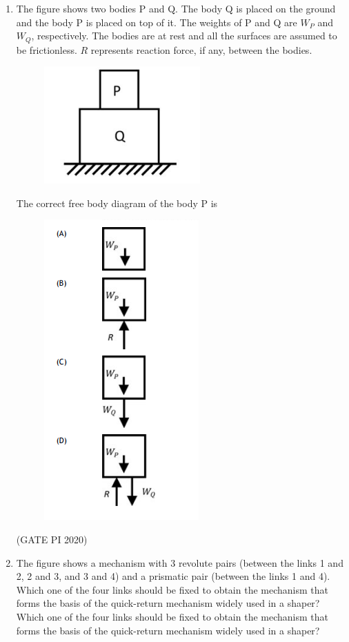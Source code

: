 \documentclass[journal,12pt,onecolumn]{IEEEtran}
\theoremstyle{remark}
\begin{document}
\begin{enumerate}
\item The figure shows two bodies P and Q. The body Q is placed on the ground and the body P is placed on top of it. The weights of P and Q are $W_P$ and $W_Q$, respectively. The bodies are at rest and all the surfaces are assumed to be frictionless. $R$ represents reaction force, if any, between the bodies.
\newpage
\begin{figure}[h]
    \centering
    \includegraphics[width=0.5\columnwidth]{figs/fig5.png}
    \caption{}
    \label{fig:placeholder}
\end{figure}


The correct free body diagram of the body P is
\begin{figure}[h]
    \includegraphics[width=0.4\columnwidth]{figs/fig6.png}
    \caption{}
    \label{fig:placeholder}
\end{figure}

\hfill (GATE PI 2020)

\item The figure shows a mechanism with 3 revolute pairs (between the links 1 and 2, 2 and 3, and 3 and 4) and a prismatic pair (between the links 1 and 4). Which one of the four links should be fixed to obtain the mechanism that forms the basis of the quick-return mechanism widely used in a shaper? Which one of the four links should be fixed to obtain the mechanism that forms the basis of the quick-return mechanism widely used in a shaper?


\end{enumerate}
\end{document}
